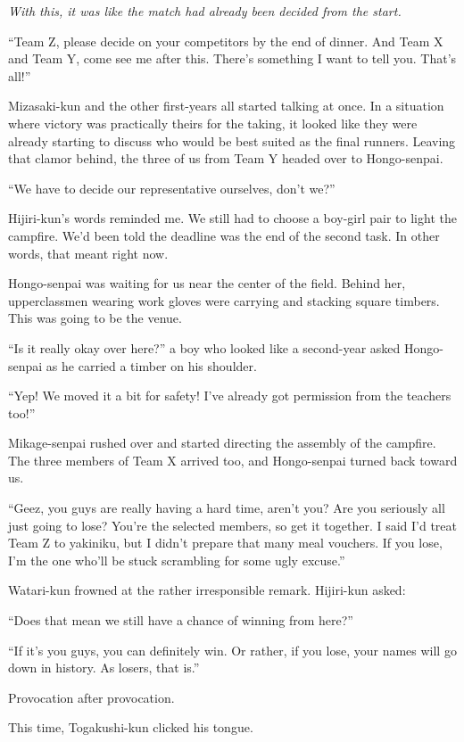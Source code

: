 \documentclass[
    a4paper,
    12pt,
    twoside,
    openany,
    UTF8,
    fontset=windows
]{ctexbook}
\begin{document}
\textit{With this, it was like the match had already been decided from the start.}

``Team Z, please decide on your competitors by the end of dinner. And Team X and Team Y, come see me after this. There's something I want to tell you. That's all!''

Mizasaki-kun and the other first-years all started talking at once. In a situation where victory was practically theirs for the taking, it looked like they were already starting to discuss who would be best suited as the final runners. Leaving that clamor behind, the three of us from Team Y headed over to Hongo-senpai.

``We have to decide our representative ourselves, don't we?''

Hijiri-kun's words reminded me. We still had to choose a boy-girl pair to light the campfire. We'd been told the deadline was the end of the second task. In other words, that meant right now.

Hongo-senpai was waiting for us near the center of the field. Behind her, upperclassmen wearing work gloves were carrying and stacking square timbers. This was going to be the venue.

``Is it really okay over here?'' a boy who looked like a second-year asked Hongo-senpai as he carried a timber on his shoulder.

``Yep! We moved it a bit for safety! I've already got permission from the teachers too!''

Mikage-senpai rushed over and started directing the assembly of the campfire. The three members of Team X arrived too, and Hongo-senpai turned back toward us.

``Geez, you guys are really having a hard time, aren't you? Are you seriously all just going to lose? You're the selected members, so get it together. I said I'd treat Team Z to yakiniku, but I didn't prepare that many meal vouchers. If you lose, I'm the one who'll be stuck scrambling for some ugly excuse.''

Watari-kun frowned at the rather irresponsible remark. Hijiri-kun asked:

``Does that mean we still have a chance of winning from here?''

``If it's you guys, you can definitely win. Or rather, if you lose, your names will go down in history. As losers, that is.''

Provocation after provocation.

This time, Togakushi-kun clicked his tongue.
\end{document}
